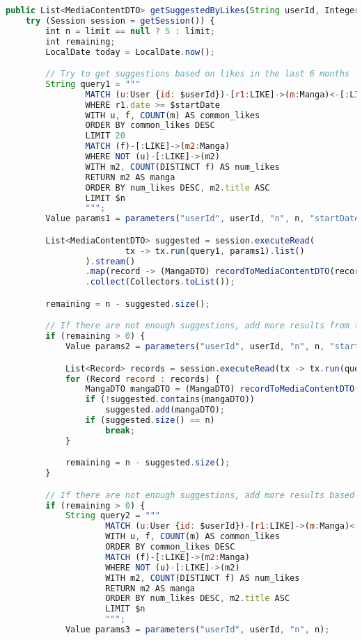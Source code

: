 \begin{lstlisting}[language=JavaScript]
public List<MediaContentDTO> getSuggestedByLikes(String userId, Integer limit) throws DAOException {
    try (Session session = getSession()) {
        int n = limit == null ? 5 : limit;
        int remaining;
        LocalDate today = LocalDate.now();

        // Try to get suggestions based on likes in the last 6 months
        String query1 = """
                MATCH (u:User {id: $userId})-[r1:LIKE]->(m:Manga)<-[:LIKE]-(f:User)
                WHERE r1.date >= $startDate
                WITH u, f, COUNT(m) AS common_likes
                ORDER BY common_likes DESC
                LIMIT 20
                MATCH (f)-[:LIKE]->(m2:Manga)
                WHERE NOT (u)-[:LIKE]->(m2)
                WITH m2, COUNT(DISTINCT f) AS num_likes
                RETURN m2 AS manga
                ORDER BY num_likes DESC, m2.title ASC
                LIMIT $n
                """;
        Value params1 = parameters("userId", userId, "n", n, "startDate", today.minusMonths(6));

        List<MediaContentDTO> suggested = session.executeRead(
                        tx -> tx.run(query1, params1).list()
                ).stream()
                .map(record -> (MangaDTO) recordToMediaContentDTO(record))
                .collect(Collectors.toList());

        remaining = n - suggested.size();

        // If there are not enough suggestions, add more results from the last 2 years
        if (remaining > 0) {
            Value params2 = parameters("userId", userId, "n", n, "startDate", today.minusYears(2));

            List<Record> records = session.executeRead(tx -> tx.run(query1, params2).list());
            for (Record record : records) {
                MangaDTO mangaDTO = (MangaDTO) recordToMediaContentDTO(record);
                if (!suggested.contains(mangaDTO))
                    suggested.add(mangaDTO);
                if (suggested.size() == n)
                    break;
            }

            remaining = n - suggested.size();
        }

        // If there are not enough suggestions, add more results based on all likes
        if (remaining > 0) {
            String query2 = """
                    MATCH (u:User {id: $userId})-[r1:LIKE]->(m:Manga)<-[:LIKE]-(f:User)
                    WITH u, f, COUNT(m) AS common_likes
                    ORDER BY common_likes DESC
                    MATCH (f)-[:LIKE]->(m2:Manga)
                    WHERE NOT (u)-[:LIKE]->(m2)
                    WITH m2, COUNT(DISTINCT f) AS num_likes
                    RETURN m2 AS manga
                    ORDER BY num_likes DESC, m2.title ASC
                    LIMIT $n
                    """;
            Value params3 = parameters("userId", userId, "n", n);


\end{lstlisting}
